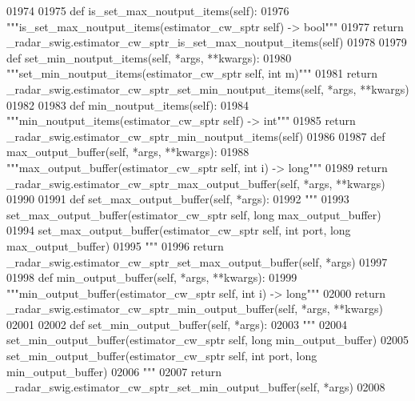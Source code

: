 \begin{DoxyCode}
{{{{{{{{01974 
01975     \textcolor{keyword}{def }is_set_max_noutput_items(self):
01976         \textcolor{stringliteral}{"""is\_set\_max\_noutput\_items(estimator\_cw\_sptr self) -> bool"""}
01977         \textcolor{keywordflow}{return} \_radar\_swig.estimator\_cw\_sptr\_is\_set\_max\_noutput\_items(self)
01978 
01979     \textcolor{keyword}{def }set_min_noutput_items(self, *args, **kwargs):
01980         \textcolor{stringliteral}{"""set\_min\_noutput\_items(estimator\_cw\_sptr self, int m)"""}
01981         \textcolor{keywordflow}{return} \_radar\_swig.estimator\_cw\_sptr\_set\_min\_noutput\_items(self, *args, **kwargs)
01982 
01983     \textcolor{keyword}{def }min_noutput_items(self):
01984         \textcolor{stringliteral}{"""min\_noutput\_items(estimator\_cw\_sptr self) -> int"""}
01985         \textcolor{keywordflow}{return} \_radar\_swig.estimator\_cw\_sptr\_min\_noutput\_items(self)
01986 
01987     \textcolor{keyword}{def }max_output_buffer(self, *args, **kwargs):
01988         \textcolor{stringliteral}{"""max\_output\_buffer(estimator\_cw\_sptr self, int i) -> long"""}
01989         \textcolor{keywordflow}{return} \_radar\_swig.estimator\_cw\_sptr\_max\_output\_buffer(self, *args, **kwargs)
01990 
01991     \textcolor{keyword}{def }set_max_output_buffer(self, *args):
01992         \textcolor{stringliteral}{"""}
01993 \textcolor{stringliteral}{        set\_max\_output\_buffer(estimator\_cw\_sptr self, long max\_output\_buffer)}
01994 \textcolor{stringliteral}{        set\_max\_output\_buffer(estimator\_cw\_sptr self, int port, long max\_output\_buffer)}
01995 \textcolor{stringliteral}{        """}
01996         \textcolor{keywordflow}{return} \_radar\_swig.estimator\_cw\_sptr\_set\_max\_output\_buffer(self, *args)
01997 
01998     \textcolor{keyword}{def }min_output_buffer(self, *args, **kwargs):
01999         \textcolor{stringliteral}{"""min\_output\_buffer(estimator\_cw\_sptr self, int i) -> long"""}
02000         \textcolor{keywordflow}{return} \_radar\_swig.estimator\_cw\_sptr\_min\_output\_buffer(self, *args, **kwargs)
02001 
02002     \textcolor{keyword}{def }set_min_output_buffer(self, *args):
02003         \textcolor{stringliteral}{"""}
02004 \textcolor{stringliteral}{        set\_min\_output\_buffer(estimator\_cw\_sptr self, long min\_output\_buffer)}
02005 \textcolor{stringliteral}{        set\_min\_output\_buffer(estimator\_cw\_sptr self, int port, long min\_output\_buffer)}
02006 \textcolor{stringliteral}{        """}
02007         \textcolor{keywordflow}{return} \_radar\_swig.estimator\_cw\_sptr\_set\_min\_output\_buffer(self, *args)
02008 
}}}}}}}}
\end{DoxyCode}
